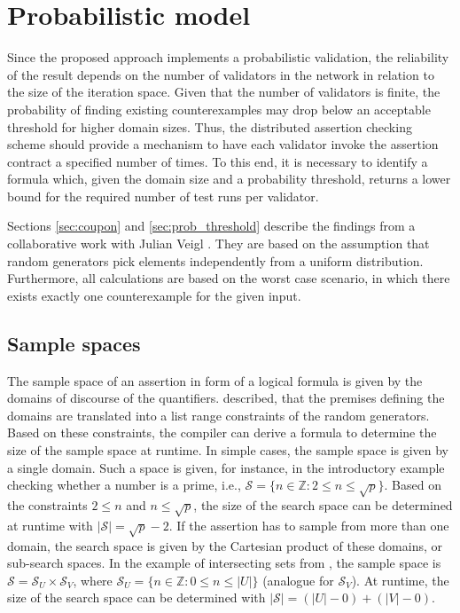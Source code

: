 \chapter{Probabilistic model}\label{chap:prob_model}
Since the proposed approach implements a probabilistic validation, the reliability of the result depends on the number of validators in the network in relation to the size of the iteration space. Given that the number of validators is finite, the probability of finding existing counterexamples may drop below an acceptable threshold for higher domain sizes. Thus, the distributed assertion checking scheme should provide a mechanism to have each validator invoke the assertion contract a specified number of times. To this end, it is necessary to identify a formula which, given the domain size and a probability threshold, returns a lower bound for the required number of test runs per validator. 

Sections \ref{sec:coupon} and \ref{sec:prob_threshold} describe the findings from a collaborative work with Julian Veigl \cite{bernhardt_veigel_2020}. They are based on the assumption that random generators pick elements independently from a uniform distribution. Furthermore, all calculations are based on the worst case scenario, in which there exists exactly one counterexample for the given input.

\section{Sample spaces}
The sample space of an assertion in form of a logical formula is given by the domains of discourse of the quantifiers. \secref described, that the premises defining the domains are translated into a list range constraints of the random generators. Based on these constraints, the compiler can derive a formula to determine the size of the sample space at runtime. In simple cases, the sample space is given by a single domain. Such a space is given, for instance, in the introductory example checking whether a number is a prime, i.e., $\mathcal{S} = \lbrace n \in\mathbb{Z} : 2 \le n \le \sqrt{p} \rbrace$. Based on the constraints $2 \le n$ and $n \le \sqrt{p}$, the size of the search space can be determined at runtime with $|\mathcal{S}| = \sqrt{p} - 2$. If the assertion has to sample from more than one domain, the search space is given by the Cartesian product of these domains, or sub-search spaces. In the example of intersecting sets from , the sample space is $\mathcal{S} = \mathcal{S}_U \times \mathcal{S}_V$, where $\mathcal{S}_U = \lbrace n \in\mathbb{Z} : 0 \leq n \le |U| \rbrace$ (analogue for $\mathcal{S}_V$). At runtime, the size of the search space can be determined with $|\mathcal{S}| = (|U| - 0) + (|V| - 0)$.

